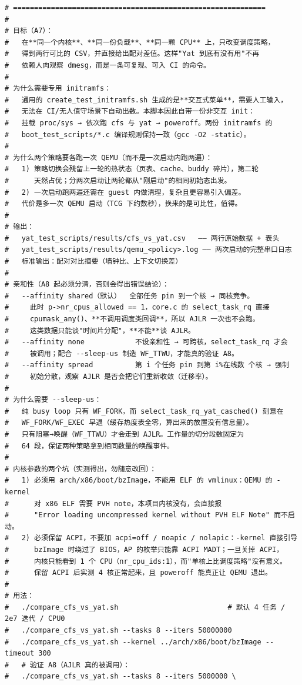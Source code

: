 \documentclass[10pt,a4paper]{article}
\newenvironment{yatpage}{\vspace*{0pt}}{\par}
\begin{document}
\begin{yatpage}
\begin{Verbatim}[fontsize=\fontsize{8.2}{9.8}\selectfont]
# ============================================================
#
# 目标（A7）：
#   在**同一个内核**、**同一份负载**、**同一颗 CPU** 上，只改变调度策略，
#   得到两行可比的 CSV，并直接给出配对差值。这样"Yat 到底有没有用"不再
#   依赖人肉观察 dmesg，而是一条可复现、可入 CI 的命令。
#
# 为什么需要专用 initramfs：
#   通用的 create_test_initramfs.sh 生成的是**交互式菜单**，需要人工输入，
#   无法在 CI/无人值守场景下自动出数。本脚本因此自带一份非交互 init：
#   挂载 proc/sys → 依次跑 cfs 与 yat → poweroff。两份 initramfs 的
#   boot_test_scripts/*.c 编译规则保持一致（gcc -O2 -static）。
#
# 为什么两个策略要各跑一次 QEMU（而不是一次启动内跑两遍）：
#   1) 策略切换会残留上一轮的热状态（页表、cache、buddy 碎片），第二轮
#      天然占优；分两次启动让两轮都从"刚启动"的相同初始态出发。
#   2) 一次启动跑两遍还需在 guest 内做清理，复杂且更容易引入偏差。
#   代价是多一次 QEMU 启动（TCG 下约数秒），换来的是可比性，值得。
#
# 输出：
#   yat_test_scripts/results/cfs_vs_yat.csv   —— 两行原始数据 + 表头
#   yat_test_scripts/results/qemu_<policy>.log —— 两次启动的完整串口日志
#   标准输出：配对对比摘要（墙钟比、上下文切换差）
#
# 亲和性（A8 起必须分清，否则会得出错误结论）：
#   --affinity shared（默认）  全部任务 pin 到一个核 → 同核竞争。
#     此时 p->nr_cpus_allowed == 1，core.c 的 select_task_rq 直接
#     cpumask_any()、**不调用调度类回调**，所以 AJLR 一次也不会跑。
#     这类数据只能谈"时间片分配"，**不能**谈 AJLR。
#   --affinity none            不设亲和性 → 可跨核，select_task_rq 才会
#     被调用；配合 --sleep-us 制造 WF_TTWU，才能真的验证 A8。
#   --affinity spread          第 i 个任务 pin 到第 i%在线数 个核 → 强制
#     初始分散，观察 AJLR 是否会把它们重新收敛（迁移率）。
#
# 为什么需要 --sleep-us：
#   纯 busy loop 只有 WF_FORK，而 select_task_rq_yat_casched() 刻意在
#   WF_FORK/WF_EXEC 早退（缓存热度表全零，算出来的放置没有信息量）。
#   只有阻塞→唤醒（WF_TTWU）才会走到 AJLR。工作量的切分段数固定为
#   64 段，保证两种策略拿到相同数量的唤醒事件。
#
# 内核参数的两个坑（实测得出，勿随意改回）：
#   1) 必须用 arch/x86/boot/bzImage，不能用 ELF 的 vmlinux：QEMU 的 -kernel
#      对 x86 ELF 需要 PVH note，本项目内核没有，会直接报
#      "Error loading uncompressed kernel without PVH ELF Note" 而不启动。
#   2) 必须保留 ACPI，不要加 acpi=off / noapic / nolapic：-kernel 直接引导
#      bzImage 时绕过了 BIOS，AP 的枚举只能靠 ACPI MADT；一旦关掉 ACPI，
#      内核只能看到 1 个 CPU（nr_cpu_ids:1），而"单核上比调度策略"没有意义。
#      保留 ACPI 后实测 4 核正常起来，且 poweroff 能真正让 QEMU 退出。
#
# 用法：
#   ./compare_cfs_vs_yat.sh                          # 默认 4 任务 / 2e7 迭代 / CPU0
#   ./compare_cfs_vs_yat.sh --tasks 8 --iters 50000000
#   ./compare_cfs_vs_yat.sh --kernel ../arch/x86/boot/bzImage --timeout 300
#   # 验证 A8（AJLR 真的被调用）：
#   ./compare_cfs_vs_yat.sh --tasks 8 --iters 5000000 \
\end{Verbatim}
\end{yatpage}
\end{document}
